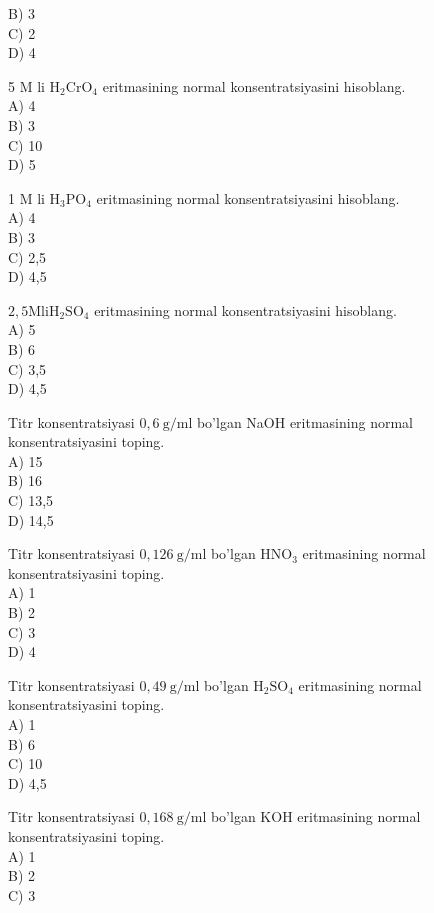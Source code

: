 B) 3\\
C) 2\\
D) 4
  \item 5 M li $\mathrm{H}_{2} \mathrm{CrO}_{4}$ eritmasining normal konsentratsiyasini hisoblang.\\
A) 4\\
B) 3\\
C) 10\\
D) 5
  \item 1 M li $\mathrm{H}_{3} \mathrm{PO}_{4}$ eritmasining normal konsentratsiyasini hisoblang.\\
A) 4\\
B) 3\\
C) 2,5\\
D) 4,5
  \item $2,5 \mathrm{M} \mathrm{li} \mathrm{H}_{2} \mathrm{SO}_{4}$ eritmasining normal konsentratsiyasini hisoblang.\\
A) 5\\
B) 6\\
C) 3,5\\
D) 4,5
  \item Titr konsentratsiyasi $0,6 \mathrm{~g} / \mathrm{ml}$ bo'lgan NaOH eritmasining normal konsentratsiyasini toping.\\
A) 15\\
B) 16\\
C) 13,5\\
D) 14,5\\
  \item Titr konsentratsiyasi $0,126 \mathrm{~g} / \mathrm{ml}$ bo'lgan $\mathrm{HNO}_{3}$ eritmasining normal konsentratsiyasini toping.\\
A) 1\\
B) 2\\
C) 3\\
D) 4
  \item Titr konsentratsiyasi $0,49 \mathrm{~g} / \mathrm{ml}$ bo'lgan $\mathrm{H}_{2} \mathrm{SO}_{4}$ eritmasining normal konsentratsiyasini toping.\\
A) 1\\
B) 6\\
C) 10\\
D) 4,5
  \item Titr konsentratsiyasi $0,168 \mathrm{~g} / \mathrm{ml}$ bo'lgan KOH eritmasining normal konsentratsiyasini toping.\\
A) 1\\
B) 2\\
C) 3\\
